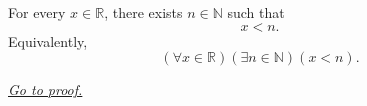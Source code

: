 \begin{lemma}
\label{lem:integer-above-lemma}
For every $x\in\mathbb{R}$, there exists $n\in\mathbb{N}$ such that
\[
  x<n.
\]
Equivalently,
\[
  (\forall x\in\mathbb{R})(\exists n\in\mathbb{N})(x<n).
\]

\smallskip
\noindent
\hyperref[prf:integer-above-lemma]{\textit{Go to proof.}}
\end{lemma}